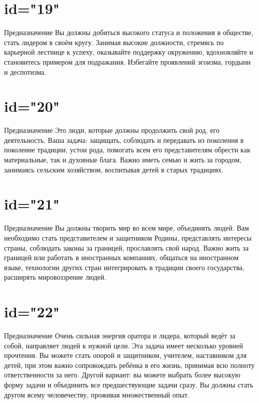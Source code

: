 \section{id="19"}{Предназначение}
Вы должны добиться высокого статуса и положения в обществе, 
стать лидером в своём кругу. Занимая высокие должности, 
стремясь по карьерной лестнице к успеху, оказывайте поддержку 
окружению, вдохновляйте и становитесь примером для подражания.
Избегайте проявлений эгоизма, гордыни и деспотизма.
\endsection

\section{id="20"}{Предназначение}
Это люди, которые должны продолжить свой род, его деятельность.
Ваша задача: защищать, соблюдать и передавать из поколения 
в поколение традиции, устои рода, помогать всем его 
представителям обрести как материальные, так и духовные блага. 
Важно иметь семью и жить за городом, занимаясь сельским 
хозяйством, воспитывая детей в старых традициях.
\endsection

\section{id="21"}{Предназначение}
Вы должны творить мир во всем мире, объединять людей. 
Вам необходимо стать представителем и защитником Родины, 
представлять интересы страны, соблюдать законы за границей, 
прославлять свой народ.
Важно жить за границей или работать в иностранных компаниях, 
общаться на иностранном языке, технологии других стран 
интегрировать в традиции своего государства, расширять 
мировоззрение людей.
\endsection

\section{id="22"}{Предназначение}
Очень сильная энергия оратора и лидера, который ведёт за 
собой, направляет людей к нужной цели. Эта задача имеет 
несколько уровней прочтения. Вы можете стать опорой и 
защитником, учителем, наставником для детей, при этом 
важно сопровождать ребёнка в его жизнь, принимая всю 
полноту ответственности за него.
Другой вариант: вы можете выбрать более высокую форму 
задачи и объединить все предшествующие задачи сразу. 
Вы должны стать другом всему человечеству, проживая 
множественный опыт.
\endsection
